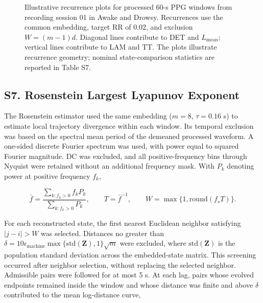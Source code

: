 \begin{figure}[p]
\centering
\caption{Illustrative recurrence plots for processed 60-s PPG windows from recording session 01 in Awake and Drowsy. Recurrences use the common embedding, target RR of 0.02, and exclusion $W=(m-1)d$. Diagonal lines contribute to DET and $L_{\mathrm{mean}}$; vertical lines contribute to LAM and TT. The plots illustrate recurrence geometry; nominal state-comparison statistics are reported in Table S7.}
\label{fig:supp_rqa}
\end{figure}

\subsection*{S7. Rosenstein Largest Lyapunov Exponent}

The Rosenstein estimator used the same embedding ($m=8$, $\tau=0.16$ s) to estimate local trajectory divergence within each window. Its temporal exclusion was based on the spectral mean period of the demeaned processed waveform. A one-sided discrete Fourier spectrum was used, with power equal to squared Fourier magnitude. DC was excluded, and all positive-frequency bins through Nyquist were retained without an additional frequency mask. With $P_k$ denoting power at positive frequency $f_k$,

\[
\bar{f}=\frac{\sum_{k:f_k>0}f_kP_k}{\sum_{k:f_k>0}P_k},\qquad T=\bar{f}^{-1},\qquad W=\max\{1,\mathrm{round}(f_sT)\}.
\]

For each reconstructed state, the first nearest Euclidean neighbor satisfying $|j-i|>W$ was selected. Distances no greater than $\delta=10\epsilon_{\mathrm{machine}}\max\{\mathrm{std}(\mathbf{Z}),1\}\sqrt{m}$ were excluded, where $\mathrm{std}(\mathbf{Z})$ is the population standard deviation across the embedded-state matrix. This screening occurred after neighbor selection, without replacing the selected neighbor. Admissible pairs were followed for at most 5 s. At each lag, pairs whose evolved endpoints remained inside the window and whose distance was finite and above $\delta$ contributed to the mean log-distance curve,

